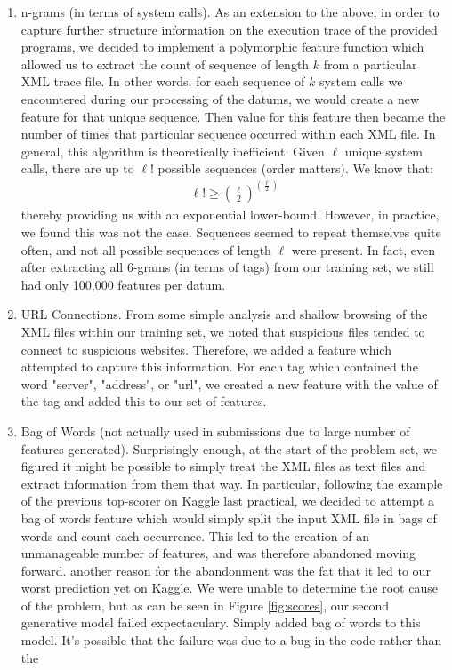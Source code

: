 \documentclass[letterpaper]{article}
\begin{document}
\begin{enumerate}
\item n-grams (in terms of system calls). As an extension to the above, in order to capture further structure information on the execution trace of the provided programs, we decided to implement a polymorphic feature function which allowed us to extract the count of sequence of length $k$ from a particular XML trace file. In other words, for each sequence of $k$ system calls we encountered during our processing of the datums, we would create a new feature for that unique sequence. Then value for this feature then became the number of times that particular sequence occurred within each XML file. In general, this algorithm is theoretically inefficient. Given $\ell$ unique system calls, there are up to $\ell!$ possible sequences (order matters). We know that:
\begin{align*}
	\ell! \geq \left(\frac{\ell}{2}\right)^{\left(\frac{\ell}{2}\right)} \tag{$\forall \ell > 0$}
\end{align*}
thereby providing us with an exponential lower-bound. However, in practice, we found this was not the case. Sequences seemed to repeat themselves quite often, and not all possible sequences of length $\ell$ were present. In fact, even after extracting all $6$-grams (in terms of tags) from our training set, we still had only 100,000 features per datum. 

\item URL Connections. From some simple analysis and shallow browsing of the XML files within our training set, we noted that suspicious files tended to connect to suspicious websites. Therefore, we added a feature which attempted to capture this information. For each tag which contained the word "server", "address", or "url", we created a new feature with the value of the tag and added this to our set of features. 

\item Bag of Words (not actually used in submissions due to large number of features generated). Surprisingly enough, at the start of the problem set, we figured it might be possible to simply treat the XML files as text files and extract information from them that way. In particular, following the example of the previous top-scorer on Kaggle last practical, we decided to attempt a bag of words feature which would simply split the input XML file in bags of words and count each occurrence. This led to the creation of an unmanageable number of features, and was therefore abandoned moving forward. another reason for the abandonment was the fat that it led to our worst prediction yet on Kaggle. We were unable to determine the root cause of the problem, but as can be seen in Figure \ref{fig:scores}, our second generative model failed expectaculary. Simply added bag of words to this model. It's possible that the failure was due to a bug in the code rather than the 
\end{enumerate}
\end{document}
